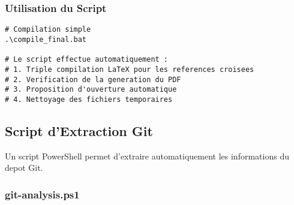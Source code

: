 \documentclass[12pt,a4paper]{article}
\begin{document}
\subsubsection{Utilisation du Script}

\begin{lstlisting}[caption=Utilisation du script de compilation]
# Compilation simple
.\compile_final.bat

# Le script effectue automatiquement :
# 1. Triple compilation LaTeX pour les references croisees
# 2. Verification de la generation du PDF
# 3. Proposition d'ouverture automatique
# 4. Nettoyage des fichiers temporaires
\end{lstlisting}

\subsection{Script d'Extraction Git}

Un script PowerShell permet d'extraire automatiquement les informations du depot Git.

\subsubsection{git-analysis.ps1}
\end{document}

